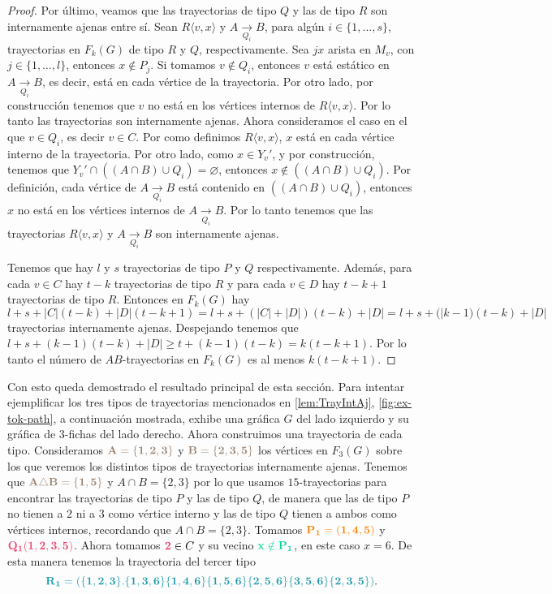 \begin{proof}
    Por \'ultimo, veamos que las trayectorias de tipo $Q$ y las de tipo $R$ son
    internamente ajenas entre s\'i. Sean $R\langle v,x \rangle$ y $A
    \xrightarrow[Q_i]{}  B$, para alg\'un $i \in \{1, \dots, s\}$, trayectorias
    en $F_k(G)$ de tipo $R$ y $Q$, respectivamente. Sea $jx$ arista en $M_v$,
    con $j \in \{1, \dots, l\}$, entonces $x \notin P_j$. Si tomamos $v \notin
    Q_i$, entonces $v$ est\'a est\'atico en $A \xrightarrow[Q_i]{} B$, es decir,
    est\'a en cada v\'ertice de la trayectoria. Por otro lado, por
    construcci\'on tenemos que $v$ no est\'a en los v\'ertices internos de $R
    \langle v, x \rangle$. Por lo tanto las trayectorias son internamente
    ajenas. Ahora consideramos el caso en el que $v \in Q_i$, es decir $v \in
    C$. Por como definimos $R \langle v,x \rangle$, $x$ est\'a en cada v\'ertice
    interno de la trayectoria. Por otro lado, como $x \in Y_v'$, y por
    construcci\'on, tenemos que $Y_v ' \cap ((A\cap B) \cup Q_i) = \varnothing$,
    entonces $x \notin ((A \cap B) \cup Q_i)$. Por definici\'on, cada v\'ertice
    de $A \xrightarrow[Q_i]{}  B$ est\'a contenido en $((A \cap B) \cup Q_i)$,
    entonces $x$ no est\'a en los v\'ertices internos de $A \xrightarrow[Q_i]{}
    B$. Por lo tanto tenemos que las trayectorias $R \langle v,x \rangle$ y $A
    \xrightarrow[Q_i]{}  B$ son internamente ajenas.

    Tenemos que hay $l$ y $s$ trayectorias de tipo $P$ y $Q$ respectivamente.
    Adem\'as, para cada $v \in C$ hay $t-k$ trayectorias de tipo $R$ y para cada
    $v \in D$ hay $t-k+1$ trayectorias de tipo $R$. Entonces en $F_k(G)$ hay $l+
    s+ |C|(t-k)+ |D|(t-k +1) = l + s + (|C| + |D|)(t-k) + |D| = l + s +
    (|k-1)(t-k) + |D|$ trayectorias internamente ajenas. Despejando tenemos que
    $l + s + (k-1)(t-k) + |D| \geq t+ (k-1)(t-k) = k (t -k +1)$. Por lo tanto el
    n\'umero de $AB$-trayectorias en $F_k(G)$ es al menos $k(t-k+1)$.

\end{proof}

Con esto queda demostrado el resultado principal de esta secci\'on. Para
intentar ejemplificar los tres tipos de trayectorias mencionados en
\cref{lem:TrayIntAj}, \cref{fig:ex-tok-path}, a continuaci\'on mostrada, exhibe
una gr\'afica $G$ del lado izquierdo y su gr\'afica de $3$-fichas del lado
derecho. Ahora construimos una trayectoria de cada tipo. Consideramos
${\color{baige}\bf A= \{1,2,3\}}$ y ${\color{baige}\bf B=\{2,3,5\}}$ los v\'ertices en
$F_3(G)$ sobre los que veremos los distintos tipos de trayectorias internamente
ajenas. Tenemos que ${\color{baige} \bf A\triangle B=\{1,5\}}$ y $A\cap B=\{2,3\}$
por lo que usamos $15$-trayectorias para encontrar las trayectorias de tipo $P$
y las de tipo $Q$, de manera que las de tipo $P$ no tienen a $2$ ni a $3$ como
v\'ertice interno y las de tipo $Q$ tienen a ambos como v\'ertices internos,
recordando que $A\cap B=\{2,3\}$. Tomamos ${\color{naranja}\bf P_1=(1,4,5)}$ y
${\color{fushia}\bf Q_1(1,2,3,5)}$. Ahora tomamos ${\color{fushia}\bf 2} \in C$ y su
vecino ${\color{menta}\bf x\notin P_1}$, en este caso $x=6$. De esta manera tenemos
la trayectoria del tercer tipo
\[
    {\color{verdeAzulado}\bf R_1=(\{1,2,3\}.\{1,3,6\}\{1,4,6\}\{1,5,6\}\{2,5,6\}
    \{3,5,6\}\{2,3,5\})}.
\]


